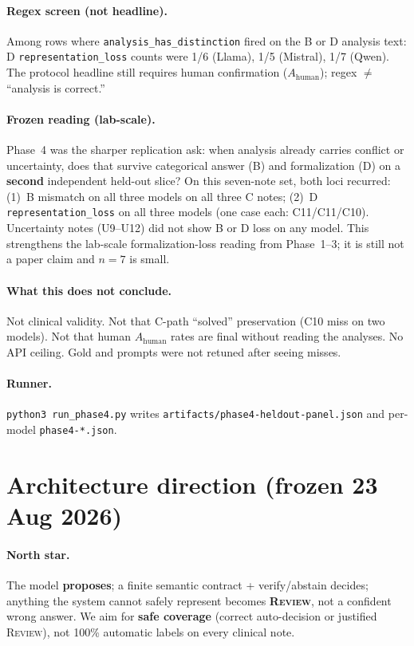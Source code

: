 \documentclass[11pt,a4paper]{article}
\newcommand{\rev}{\textsc{Review}}
\begin{document}
\paragraph{Regex screen (not headline).}
Among rows where \texttt{analysis\_has\_distinction} fired on the B or D analysis text:
D \texttt{representation\_loss} counts were 1/6 (Llama), 1/5 (Mistral), 1/7 (Qwen).
The protocol headline still requires human confirmation ($A_{\text{human}}$); regex $\neq$ ``analysis is correct.''

\paragraph{Frozen reading (lab-scale).}
Phase~4 was the sharper replication ask: when analysis already carries conflict or uncertainty, does that survive categorical answer (B) and formalization (D) on a \textbf{second} independent held-out slice?
On this seven-note set, both loci recurred:
(1)~B mismatch on all three models on all three C notes;
(2)~D \texttt{representation\_loss} on all three models (one case each: C11/C11/C10).
Uncertainty notes (U9--U12) did not show B or D loss on any model.
This strengthens the lab-scale formalization-loss reading from Phase~1--3; it is still not a paper claim and $n=7$ is small.

\paragraph{What this does not conclude.}
Not clinical validity. Not that C-path ``solved'' preservation (C10 miss on two models).
Not that human $A_{\text{human}}$ rates are final without reading the analyses.
No API ceiling. Gold and prompts were not retuned after seeing misses.

\paragraph{Runner.}
\texttt{python3 run\_phase4.py} writes \texttt{artifacts/phase4-heldout-panel.json} and per-model \texttt{phase4-*.json}.

\section{Architecture direction (frozen 23 Aug 2026)}

\paragraph{North star.}
The model \textbf{proposes}; a finite semantic contract + verify/abstain decides; anything the system cannot safely represent becomes \textbf{\rev}, not a confident wrong answer.
We aim for \textbf{safe coverage} (correct auto-decision or justified \rev), not 100\% automatic labels on every clinical note.
\end{document}
